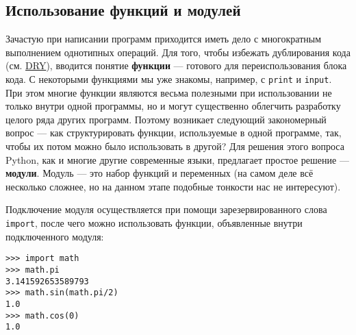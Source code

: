 \begin{Shaded}
\end{Shaded}

\subsection{Использование функций и
модулей}\label{ux438ux441ux43fux43eux43bux44cux437ux43eux432ux430ux43dux438ux435-ux444ux443ux43dux43aux446ux438ux439-ux438-ux43cux43eux434ux443ux43bux435ux439}

Зачастую при написании программ приходится иметь дело с многократным
выполнением однотипных операций. Для того, чтобы избежать дублирования
кода (см.
\href{https://wikipedia.org/ru/Don\%E2\%80\%99t_repeat_yourself}{DRY}),
вводится понятие \textbf{функции} --- готового для переиспользования
блока кода. С некоторыми функциями мы уже знакомы, например, с
\texttt{print} и \texttt{input}. При этом многие функции являются весьма
полезными при использовании не только внутри одной программы, но и могут
существенно облегчить разработку целого ряда других программ. Поэтому
возникает следующий закономерный вопрос --- как структурировать функции,
используемые в одной программе, так, чтобы их потом можно было
использовать в другой? Для решения этого вопроса Python, как и многие
другие современные языки, предлагает простое решение ---
\textbf{модули}. Модуль --- это набор функций и переменных (на самом
деле всё несколько сложнее, но на данном этапе подобные тонкости нас не
интересуют).

Подключение модуля осуществляется при помощи зарезервированного слова
\texttt{import}, после чего можно использовать функции, объявленные
внутри подключенного модуля:

\begin{verbatim}
>>> import math
>>> math.pi
3.141592653589793
>>> math.sin(math.pi/2)
1.0
>>> math.cos(0)
1.0
\end{verbatim}

